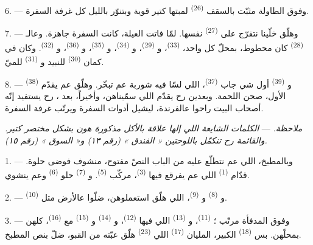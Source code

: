 6. --- وفوق الطاولة مثبّت بالسقف 
\textsuperscript{(26)} لمبتها كتير قوية وبتنوّر بالليل كل غرفة السفرة.

7. --- وهلّق خلّينا نتفرّج على  \textsuperscript{(27)}
نفسها. لمّا فاتت العيلة، كانت السفرة جاهزة. وعالـ
\textsuperscript{(28)} كان محطوط، بمحلّ كل واحد، 
\textsuperscript{(33)}، و \textsuperscript{(29)}،
و \textsuperscript{(34)}، و \textsuperscript{(35)}،
و \textsuperscript{(36)}، و
\textsuperscript{(32)}. وكان في كمان  \textsuperscript{(30)}
للنبيد و \textsuperscript{(31)} للميّ.

8. --- و \textsuperscript{(39)} أول شي جاب  \textsuperscript{(37)}، اللي لسّا فيه شوربة عم تبخّر. وهلّق عم
يقدّم  \textsuperscript{(38)} الأول، صحن اللحمة. وبعدين رح
يقدّم اللي سمّيناهن، وأخيراً، بعد ، رح يستفيد إنّه
أصحاب البيت راحوا عالفرندة، ليشيل أدوات السفرة ويرتّب غرفة السفرة.

\textit{ملاحظة.} --- \textit{الكلمات الشايعة اللي إلها علاقة بالأكل
مذكورة هون بشكل مختصر كتير. والقائمة رح تنكمّل باللوحتين « الفندق »
(رقم ١٣) و« السوق » (رقم ١٥).}

\VUsaut{4.6mm}
\VUsaut{3.0mm}

1. --- وبالمطبخ، اللي عم نتطلّع عليه من الباب النصّ مفتوح، منشوف فوضى
حلوة. قدّام  \textsuperscript{(1)} اللي عم يفرقع فيها
 \textsuperscript{(3)}، مركّب 
\textsuperscript{(5)}. و \textsuperscript{(7)} حلو
 \textsuperscript{(6)} وعم ينشوي.

2. --- و \textsuperscript{(8)} و
\textsuperscript{(9)}، اللي هلّق استعملوهن، ضلّوا عالأرض متل
 \textsuperscript{(10)}.

3. --- وفوق المدفأة مرتّب ؛  \textsuperscript{(11)}،
و \textsuperscript{(13)} اللي فيها
 \textsuperscript{(12)}، و
\textsuperscript{(14)} و \textsuperscript{(15)} مع
 \textsuperscript{(16)}، كلهن بمحلّهن. بس  \textsuperscript{(18)} الكبير، المليان 
\textsuperscript{(17)} اللي  \textsuperscript{(23)} هلّق
عبّته من القبو، ضلّ بنص المطبخ.

